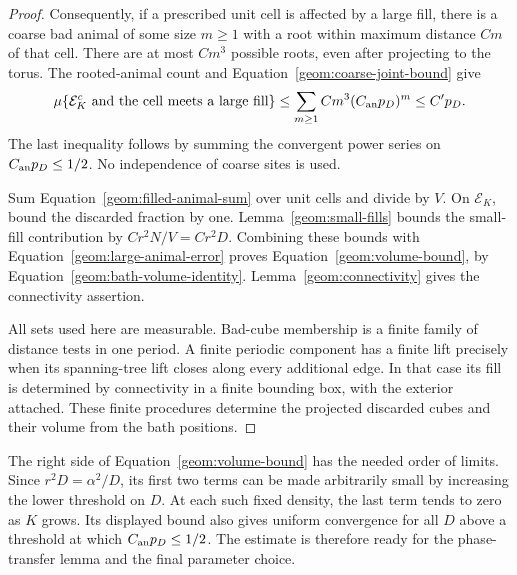 \begin{proof}
Consequently, if a prescribed unit cell is affected by a large fill,
there is a coarse bad animal of some size $m\ge1$ with a root within
maximum distance $C m$ of that cell. There are at most $C m^3$ possible
roots, even after projecting to the torus. The rooted-animal count and
Equation~\eqref{geom:coarse-joint-bound} give
\begin{equation}\label{geom:filled-animal-sum}
 \mu\{\mathcal E_K^c\text{ and the cell meets a large fill}\}
 \le\sum_{m\ge1} C m^3(C_{\rm an}p_D)^m\le C'p_D.
\end{equation}
The last inequality follows by summing the convergent power series on
$C_{\rm an}p_D\le1/2$. No independence of coarse sites is used.

Sum Equation~\eqref{geom:filled-animal-sum} over unit cells and divide
by $V$. On $\mathcal E_K$, bound the discarded fraction by one.
Lemma~\ref{geom:small-fills} bounds the small-fill contribution by
$Cr^2N/V=Cr^2D$. Combining these bounds with
Equation~\eqref{geom:large-animal-error} proves
Equation~\eqref{geom:volume-bound}, by
Equation~\eqref{geom:bath-volume-identity}.
Lemma~\ref{geom:connectivity} gives the connectivity assertion.

All sets used here are measurable. Bad-cube membership is a finite family
of distance tests in one period. A finite periodic component has a finite
lift precisely when its spanning-tree lift closes along every additional
edge. In that case its fill is determined by connectivity in a finite
bounding box, with the exterior attached. These finite procedures determine
the projected discarded cubes and their volume from the bath positions.
\end{proof}

The right side of Equation~\eqref{geom:volume-bound} has the needed order
of limits. Since $r^2D=\alpha^2/D$, its first two terms can be made
arbitrarily small by increasing the lower threshold on $D$. At each such
fixed density, the last term tends to zero as $K$ grows. Its displayed
bound also gives uniform convergence for all $D$ above a threshold at
which $C_{\rm an}p_D\le1/2$. The estimate is therefore ready for the
phase-transfer lemma and the final parameter choice.
